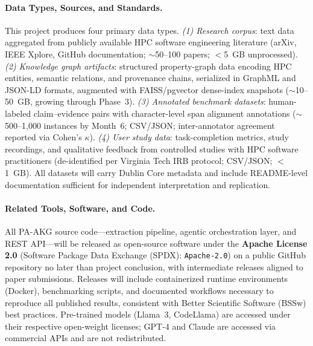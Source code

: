 
\paragraph{Data Types, Sources, and Standards.}
This project produces four primary data types.
\textit{(1) Research corpus}: text data aggregated from publicly available HPC software engineering literature (arXiv, IEEE Xplore, GitHub documentation; $\sim$50--100 papers; $<$5~GB unprocessed).
\textit{(2) Knowledge graph artifacts}: structured property-graph data encoding HPC entities, semantic relations, and provenance chains, serialized in GraphML and JSON-LD formats, augmented with FAISS/pgvector dense-index snapshots ($\sim$10--50~GB, growing through Phase~3).
\textit{(3) Annotated benchmark datasets}: human-labeled claim--evidence pairs with character-level span alignment annotations ($\sim$500--1{,}000 instances by Month~6; CSV/JSON; inter-annotator agreement reported via Cohen's $\kappa$).
\textit{(4) User study data}: task-completion metrics, study recordings, and qualitative feedback from controlled studies with HPC software practitioners (de-identified per Virginia Tech IRB protocol; CSV/JSON; $<$1~GB).
All datasets will carry Dublin Core metadata and include README-level documentation sufficient for independent interpretation and replication.

\paragraph{Related Tools, Software, and Code.}
All PA-AKG source code---extraction pipeline, agentic orchestration layer, and REST API---will be released as open-source software under the \textbf{Apache License 2.0} (Software Package Data Exchange (SPDX): \texttt{Apache-2.0}) on a public GitHub repository no later than project conclusion, with intermediate releases aligned to paper submissions. Releases will include containerized runtime environments (\eg Docker), benchmarking scripts, and documented workflows necessary to reproduce all published results, consistent with Better Scientific Software (BSSw) best practices. Pre-trained models (Llama~3, CodeLlama) are accessed under their respective open-weight licenses; GPT-4 and Claude are accessed via commercial APIs and are not redistributed.

